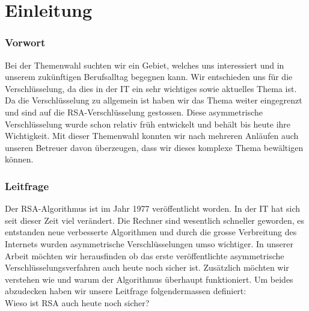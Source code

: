 \part{Einleitung}
\section{Vorwort}
Bei der Themenwahl suchten wir ein Gebiet, welches uns interessiert und in unserem zukünftigen Berufsalltag begegnen kann. Wir entschieden uns für die Verschlüsselung, da dies in der IT ein sehr wichtiges sowie aktuelles Thema ist. Da die Verschlüsselung zu allgemein ist haben wir das Thema weiter eingegrenzt und sind auf die RSA-Verschlüsselung gestossen. Diese asymmetrische Verschlüsselung wurde schon relativ früh entwickelt und behält bis heute ihre Wichtigkeit. Mit dieser Themenwahl konnten wir nach mehreren Anläufen auch unseren Betreuer davon überzeugen, dass wir dieses komplexe Thema bewältigen können. 

\section{Leitfrage}
Der RSA-Algorithmus ist im Jahr 1977 veröffentlicht worden. In der IT hat sich seit dieser Zeit viel verändert. Die Rechner sind wesentlich schneller geworden, es entstanden neue verbesserte Algorithmen und durch die grosse Verbreitung des Internets wurden asymmetrische Verschlüsselungen umso wichtiger. In unserer Arbeit möchten wir herausfinden ob das erste veröffentlichte asymmetrische Verschlüsselungsverfahren auch heute noch sicher ist. Zusätzlich möchten wir verstehen wie und warum der Algorithmus überhaupt funktioniert. Um beides abzudecken haben wir unsere Leitfrage folgendermassen definiert:\\
Wieso ist RSA auch heute noch sicher?